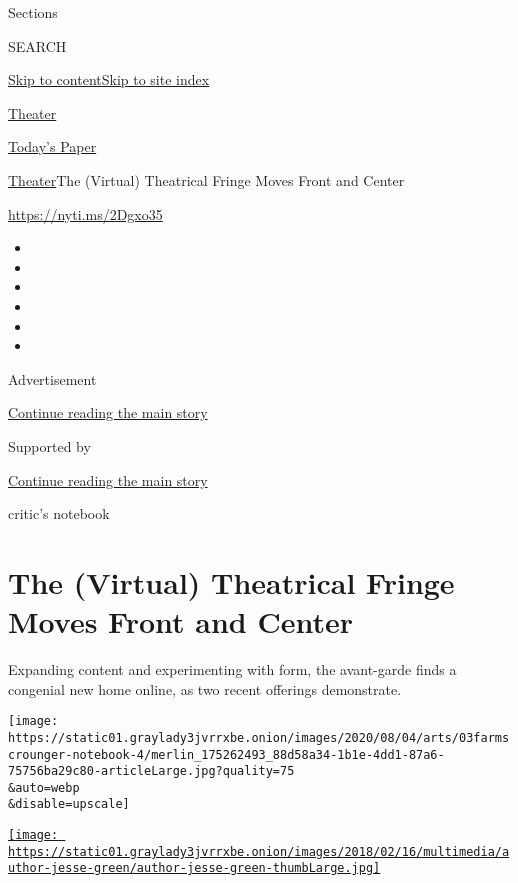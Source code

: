 Sections

SEARCH

\protect\hyperlink{site-content}{Skip to
content}\protect\hyperlink{site-index}{Skip to site index}

\href{https://www.nytimes3xbfgragh.onion/section/theater}{Theater}

\href{https://myaccount.nytimes3xbfgragh.onion/auth/login?response_type=cookie\&client_id=vi}{}

\href{https://www.nytimes3xbfgragh.onion/section/todayspaper}{Today's
Paper}

\href{/section/theater}{Theater}\textbar{}The (Virtual) Theatrical
Fringe Moves Front and Center

\url{https://nyti.ms/2Dgxo35}

\begin{itemize}
\item
\item
\item
\item
\item
\item
\end{itemize}

Advertisement

\protect\hyperlink{after-top}{Continue reading the main story}

Supported by

\protect\hyperlink{after-sponsor}{Continue reading the main story}

critic's notebook

\hypertarget{the-virtual-theatrical-fringe-moves-front-and-center}{%
\section{The (Virtual) Theatrical Fringe Moves Front and
Center}\label{the-virtual-theatrical-fringe-moves-front-and-center}}

Expanding content and experimenting with form, the avant-garde finds a
congenial new home online, as two recent offerings demonstrate.

\texttt{[image: https://static01.graylady3jvrrxbe.onion/images/2020/08/04/arts/03farmscrounger-notebook-4/merlin\_175262493\_88d58a34-1b1e-4dd1-87a6-75756ba29c80-articleLarge.jpg?quality=75\\\&auto=webp\\\&disable=upscale]}

\href{https://www.nytimes3xbfgragh.onion/by/jesse-green}{\texttt{[image: https://static01.graylady3jvrrxbe.onion/images/2018/02/16/multimedia/author-jesse-green/author-jesse-green-thumbLarge.jpg]}}


